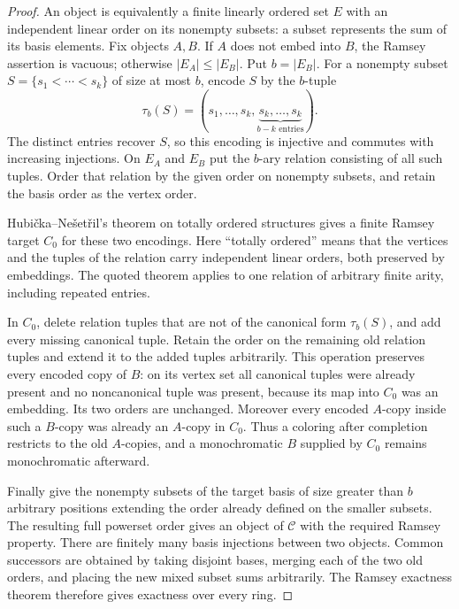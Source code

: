 \begin{proof}
An object is equivalently a finite linearly ordered set $E$ with an
independent linear order on its nonempty subsets: a subset represents
the sum of its basis elements.  Fix objects $A,B$. If $A$ does not
embed into $B$, the Ramsey assertion is vacuous; otherwise
$|E_A|\leq |E_B|$. Put $b=|E_B|$.
For a nonempty subset $S=\{s_1<\cdots<s_k\}$ of size at most $b$, encode
$S$ by the $b$-tuple
\[
 \tau_b(S)=(s_1,\ldots,s_k,
                 \underbrace{s_k,\ldots,s_k}_{b-k\text{ entries}}).
\]
The distinct entries recover $S$, so this encoding is injective and
commutes with increasing injections.  On $E_A$ and $E_B$ put the
$b$-ary relation consisting of all such tuples.  Order that relation by
the given order on nonempty subsets, and retain the basis order as the
vertex order.

Hubi\v cka--Ne\v set\v ril's theorem on totally ordered structures
\cite[Theorem~4.46, arXiv v4]{DHubickaNesetril2019} gives a finite
Ramsey target $C_0$ for these two encodings.  Here ``totally ordered''
means that the vertices and the tuples of the relation carry independent
linear orders, both preserved by embeddings.  The quoted theorem applies
to one relation of arbitrary finite arity, including repeated entries.

In $C_0$, delete relation tuples that are not of the canonical form
$\tau_b(S)$, and add every missing canonical tuple.  Retain the order
on the remaining old relation tuples and extend it to the added tuples
arbitrarily.  This operation preserves every encoded copy of $B$:
on its vertex set all canonical tuples were already present and no
noncanonical tuple was present, because its map into $C_0$ was an
embedding.  Its two orders are unchanged.  Moreover every encoded
$A$-copy inside such a $B$-copy was already an $A$-copy in $C_0$.
Thus a coloring after completion restricts to the old $A$-copies, and
a monochromatic $B$ supplied by $C_0$ remains monochromatic afterward.

Finally give the nonempty subsets of the target basis of size greater
than $b$ arbitrary positions extending the order already defined on
the smaller subsets.  The resulting full powerset order gives an object
of $\mathcal C$ with the required Ramsey property.
There are finitely many basis injections between two objects.
Common successors are obtained by taking disjoint bases, merging each
of the two old orders, and placing the new mixed subset sums arbitrarily.
The Ramsey exactness theorem therefore gives exactness over every ring.
\end{proof}


